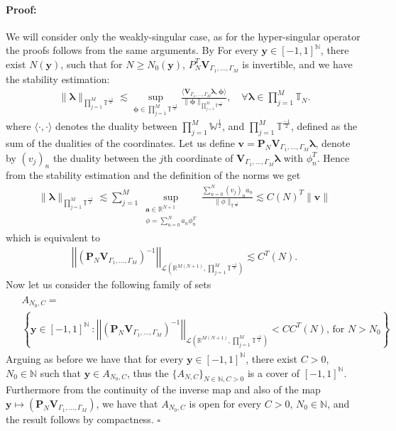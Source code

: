 \documentclass{article}
\newenvironment{proof}{\paragraph{Proof:}}{\hfill$\square$}
\newcommand{\ba} {\bm a}
\newcommand{\IN}{{\mathbb N}}
\newcommand{\IR}{{\mathbb R}}
\newcommand{\IT}{{\mathbb T}}
\newcommand{\IW}{{\mathbb W}}
\newcommand{\bla}{\boldsymbol \lambda}
\newcommand{\bphi}{\boldsymbol \phi}
\newcommand{\bv}{\bm{v}}
\newcommand{\by}{\bm{y}}
\begin{document}
\begin{proof}We will consider only the weakly-singular case, as for the hyper-singular operator the proofs follows from the same arguments.
By \cite[Theorem 4.2.9]{Sauter:2011} For every $\by \in [-1,1]^{\IN}$, there exist $N(\by)$, such that for $N\geq N_0(\by)$, $P_N^T \mathbf{V}_{\Gamma_1, \hdots,\Gamma_M}$ is invertible, and we have the stability estimation: 
\begin{align*}
\| \bla \|_{\prod_{j=1}^M \IT^{\frac{-1}{2}}} \lesssim  \sup_{\bphi \in  \prod_{j=1}^M \IT^{\frac{-1}{2}}} \frac{\langle \mathbf{V}_{\Gamma_1,\hdots,\Gamma_M} \bla, \bphi \rangle}{\|\bphi\|_{ \prod_{j=1}^M \IT^{\frac{-1}{2}}}} , \quad \forall \bla \in \prod_{j=1}^M \IT_N.
\end{align*}
where $\langle \cdot , \cdot \rangle$ denotes the duality between $\prod_{j=1}^M \IW^{\frac{1}{2}}$, and $\prod_{j=1}^M \IT^{\frac{-1}{2}}$, defined as the sum of the dualities of the coordinates. Let us define $\bv = \mathbf{P}_N \mathbf{V}_{\Gamma_1,\hdots,\Gamma_M} \bla$, denote by $(v_j)_n$ the duality between the $j$th coordinate of $\mathbf{V}_{\Gamma_1,\hdots,\Gamma_M} \bla$ with $\phi^T_n$. Hence from the stability estimation and the definition of the norms we get 
\begin{align*}
\| \bla \|_{\prod_{j=1}^M \IT^{\frac{-1}{2}}} \lesssim  \sum_{j =1} ^M  \sup_{\substack{\ba \in \IR^{N+1}\\\phi = \sum_{n=0}^N a_n \phi_n^T}} \frac{\sum_{n=0}^N (v_j)_n a_n }{\| \phi\|_{\IT^{\frac{-1}{2}}}}  \lesssim C(N)^T\|\bv\| 
\end{align*}
which is equivalent to 
\begin{align*}
\left\vert\left\vert (\mathbf{P}_N \mathbf{V}_{\Gamma_1,\hdots,\Gamma_M})^{-1} \right\vert\right\vert_{\mathcal{L}( \IR^{M(N+1)}, \prod_{j=1}^M \IT^{\frac{-1}{2}})} \lesssim C^T(N).
\end{align*}
Now let us consider the following family of sets 
\begin{align*}
\begin{split}
&A_{N_0,C} =  \\ &\left\lbrace 
\by \in [-1,1]^{\IN} \ : \left\vert\left\vert (\mathbf{P}_N \mathbf{V}_{\Gamma_1,\hdots,\Gamma_M})^{-1} \right\vert\right\vert_{\mathcal{L}( \IR^{M(N+1)}, \prod_{j=1}^M \IT^{\frac{-1}{2}})} < C C^T(N)  \text{, for $N > N_0$}
\right\rbrace.
\end{split}
\end{align*}
Arguing as before we have that for every $\by \in [-1,1]^{\IN}$, there exist $C>0$, $N_0 \in \IN$ such that $\by \in A_{N_0,C}$, thus the  $\{A_{N,C}\}_{N \in \IN, C > 0}$ is a cover of $[-1,1]^{\IN}$. Furthermore from the continuity of the inverse map and also of the map $\by \mapsto (\mathbf{P}_N \mathbf{V}_{\Gamma_1,\hdots,\Gamma_M})$, we have that $A_{N_0,C}$ is open for every $C >0$, $N_0 \in \IN$, and the result follows by compactness.
\end{proof}
\end{document}
